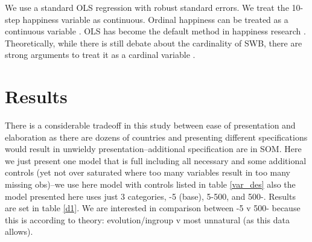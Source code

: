 \documentclass[10pt, letterpaper]{article}
\begin{document}
We use a standard OLS regression with robust standard errors.  We treat the 10-step
happiness variable as continuous. Ordinal happiness can be treated as a
continuous variable \citep{carbonell04}.
%
OLS has become the default method in happiness research
\citep{blanchflower11}. Theoretically, while there is still debate about the
cardinality of SWB, there are strong arguments to treat it as a cardinal
variable \citep{ng96,ng97}. 








\section{Results}

%
There is a considerable tradeoff in this study between ease of presentation and
elaboration as there are dozens of countries and presenting different
specifications would result in unwieldy presentation--additional specification
are in SOM. Here we just present one model that is full including all necessary
and some additional controls (yet not over saturated where too many variables
result in too many missing obs)--we use here model with controls listed in table
\ref{var_des} 
also the model presented here uses just 3
categories, -5 (base), 5-500, and 500-. Results are set in table \ref{d1}. 
We are interested in comparison between
-5 v 500- because this is according to theory: evolution/ingroup v most
unnatural (as this data allows).
\end{document}
